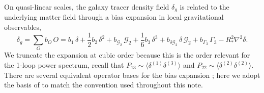 \documentclass[a4paper,11pt]{article}
\newcommand{\<}{\langle}
\renewcommand{\>}{\rangle}
\begin{document}
On quasi-linear scales, the galaxy tracer density field \(\delta_g\) is related to the underlying matter field through a bias expansion in local gravitational observables,
\begin{equation}
\delta_g
=
\sum_O b_O\,O
=
b_1\,\delta
+\frac{1}{2}b_2\,\delta^2
+b_{\mathcal G_2}\,\mathcal G_2
+\frac{1}{6}b_3\,\delta^3
+b_{\delta\mathcal G_2}\,\delta\,\mathcal G_2
+b_{\Gamma_3}\,\Gamma_3
-R_*^2\nabla^2\delta.
\end{equation}
We truncate the expansion at cubic order because this is the order relevant for the 1-loop power spectrum, recall that \(P_{13}\sim \langle \delta^{(1)}\delta^{(3)}\rangle\) and \(P_{22}\sim \langle \delta^{(2)}\delta^{(2)}\rangle\). There are several equivalent operator bases for the bias expansion \citep[see, e.g.,][]{Desjacques:2016bnm,Desjacques:2018pfv}; here we adopt the basis of \cite{Chudaykin:2020aoj} to match the convention used throughout this note.
\end{document}
